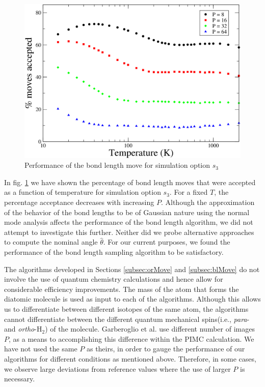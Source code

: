                 \begin{figure}[!htbp]
                    \centering
                    \includegraphics[scale=0.20,keepaspectratio]{Chapter-4/Figures/s3BlAcc.png}
                    \caption{Performance of the bond length move for simulation option $s_3$}
                    \label{fig:variableBlAcc}
                \end{figure}

                In fig. \ref{fig:variableBlAcc} we have shown the percentage of bond length moves that were accepted as a function of temperature for simulation option $s_3$. For a fixed $T$, the percentage acceptance decreases with increasing $P$. Although the approximation of the behavior of the bond lengths to be of Gaussian nature using the normal mode analysis affects the performance of the bond length algorithm, we did not attempt to investigate this further. Neither did we probe alternative approaches to compute the nominal angle $\hat \theta$. For our current purposes, we found the performance of the bond length sampling algorithm to be satisfactory.

                The algorithms developed in Sections \ref{subsec:orMove} and \ref{subsec:blMove} do not involve the use of quantum chemistry calculations and hence allow for considerable efficiency improvements. The mass of the atom that forms the diatomic molecule is used as input to each of the algorithms. Although this allows us to differentiate between different isotopes of the same atom, the algorithms cannot differentiate between the different quantum mechanical spins(i.e., \emph{para}- and \emph{ortho}-H$_2$) of the molecule. Garberoglio et al. \cite{Garberoglio2014} use different number of images $P$, as a means to accomplishing this difference within the PIMC calculation. We have not used the same $P$ as theirs, in order to gauge the performance of our algorithms for different conditions as mentioned above. Therefore, in some cases, we observe large deviations from reference values where the use of larger $P$ is necessary. 
